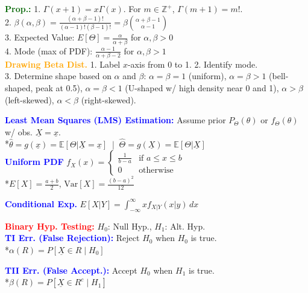 \documentclass[5pt]{extarticle} %
\begin{document}
\begin{paracol}{3}
{    \textcolor{darkgreen}{\textbf{Prop.:}} 1. $\Gamma(x+1) = x \Gamma(x)$. For $m \in \mathbb{Z}^+$, $\Gamma(m+1) = m!$. \\
    2. $\beta(\alpha,\beta) = \frac{(\alpha + \beta -1)!}{(\alpha - 1)! (\beta - 1)!} = \beta \binom{\alpha + \beta - 1}{\alpha - 1}$ \\
    3. Expected Value: $E[\Theta] = \frac{\alpha}{\alpha + \beta}$ for $\alpha, \beta > 0$ \\
    4. Mode (max of PDF): $\frac{\alpha - 1}{\alpha + \beta - 2}$ for $\alpha, \beta > 1$ \\

    \textcolor{orange}{\textbf{Drawing Beta Dist.}} 1. Label $x$-axis from 0 to 1. 2. Identify mode. \\ 
    3. Determine shape based on $\alpha$ and $\beta$: $\alpha = \beta = 1$ (uniform), $\alpha = \beta > 1$ (bell-shaped, peak at 0.5), $\alpha = \beta < 1$ (U-shaped w/ high density near 0 and 1), $\alpha > \beta$ (left-skewed), $\alpha < \beta$ (right-skewed).

    \textcolor{blue}{\textbf{Least Mean Squares (LMS) Estimation:}} Assume prior $P_\Theta (\theta)$ or $f_\Theta (\theta)$ w/ obs. $\underline{X} = \underline{x}$. \\
    *$\hat{\theta} = g(\underline{x}) = \mathbb{E} [\Theta | \underline{X} = \underline{x}] \; \mid \; \hat{\Theta} = g(\underline{X}) = \mathbb{E} [\Theta | \underline{X}]$ \\

    \textcolor{blue}{\textbf{Uniform PDF}} $f_X(x) = \begin{cases}
        \frac{1}{b - a} & \text{if } a \leq x \leq b \\
        0 & \text{otherwise}
    \end{cases}$ \\
    *$E[X] = \frac{a + b}{2}$, $\text{Var}[X] = \frac{(b - a)^2}{12}$

    \textcolor{blue}{\textbf{Conditional Exp.}} $E[X|Y] = \int_{-\infty}^{\infty} x f_{X|Y} (x|y) \, dx$

    \textcolor{red}{\textbf{Binary Hyp. Testing:}} $H_0$: Null Hyp., $H_1$: Alt. Hyp. \\

    \textcolor{blue}{\textbf{TI Err. (False Rejection):}} Reject $H_0$ when $H_0$ is true. \\
    *$\alpha(R) = P[\underline{X} \in R \mid H_0]$ 

    \textcolor{blue}{\textbf{TII Err. (False Accept.):}} Accept $H_0$ when $H_1$ is true. \\
    *$\beta(R) = P[\underline{X} \in R^c \mid H_1]$ \\

}
\end{paracol}
\end{document}
